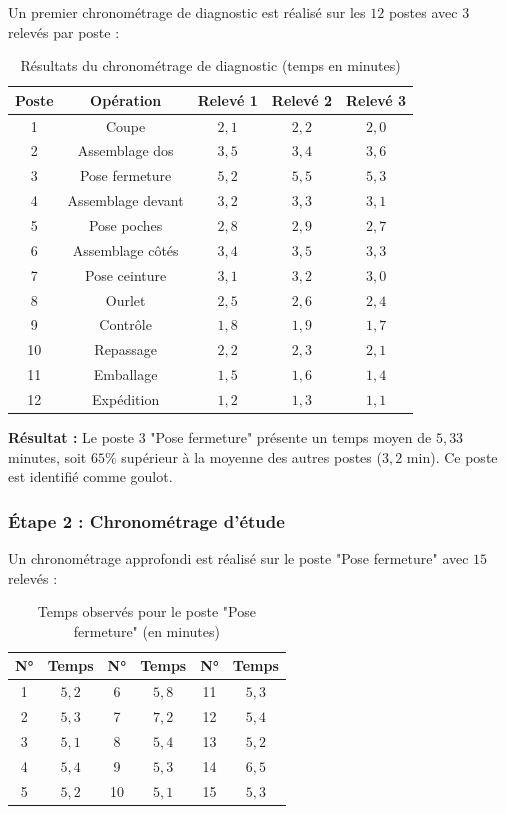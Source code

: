 \documentclass[a4paper,12pt]{article}
\begin{document}
Un premier chronométrage de diagnostic est réalisé sur les $12$ postes avec $3$ relevés par poste :

\begin{table}[ht]
\centering
\begin{tabular}{|c|c|c|c|c|}
\hline
\textbf{Poste} & \textbf{Opération} & \textbf{Relevé 1} & \textbf{Relevé 2} & \textbf{Relevé 3} \\
\hline
1 & Coupe & $2,1$ & $2,2$ & $2,0$ \\
2 & Assemblage dos & $3,5$ & $3,4$ & $3,6$ \\
3 & Pose fermeture & $5,2$ & $5,5$ & $5,3$ \\
4 & Assemblage devant & $3,2$ & $3,3$ & $3,1$ \\
5 & Pose poches & $2,8$ & $2,9$ & $2,7$ \\
6 & Assemblage côtés & $3,4$ & $3,5$ & $3,3$ \\
7 & Pose ceinture & $3,1$ & $3,2$ & $3,0$ \\
8 & Ourlet & $2,5$ & $2,6$ & $2,4$ \\
9 & Contrôle & $1,8$ & $1,9$ & $1,7$ \\
10 & Repassage & $2,2$ & $2,3$ & $2,1$ \\
11 & Emballage & $1,5$ & $1,6$ & $1,4$ \\
12 & Expédition & $1,2$ & $1,3$ & $1,1$ \\
\hline
\end{tabular}
\caption{Résultats du chronométrage de diagnostic (temps en minutes)}
\end{table}

\textbf{Résultat :} Le poste 3 "Pose fermeture" présente un temps moyen de $5,33$ minutes, soit $65\%$ supérieur à la moyenne des autres postes ($3,2$ min). Ce poste est identifié comme goulot.

\subsubsection{Étape 2 : Chronométrage d'étude}

Un chronométrage approfondi est réalisé sur le poste "Pose fermeture" avec $15$ relevés :

\begin{table}[ht]
\centering
\begin{tabular}{|c|c|c|c|c|c|}
\hline
\textbf{N°} & \textbf{Temps} & \textbf{N°} & \textbf{Temps} & \textbf{N°} & \textbf{Temps} \\
\hline
1 & $5,2$ & 6 & $5,8$ & 11 & $5,3$ \\
2 & $5,3$ & 7 & $7,2$ & 12 & $5,4$ \\
3 & $5,1$ & 8 & $5,4$ & 13 & $5,2$ \\
4 & $5,4$ & 9 & $5,3$ & 14 & $6,5$ \\
5 & $5,2$ & 10 & $5,1$ & 15 & $5,3$ \\
\hline
\end{tabular}
\caption{Temps observés pour le poste "Pose fermeture" (en minutes)}
\end{table}
\end{document}
